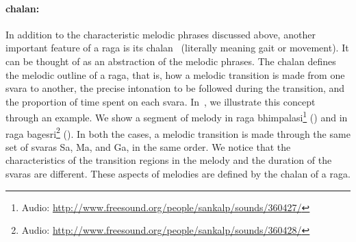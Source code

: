 \paragraph{\Gls{chalan}:} In addition to the characteristic melodic phrases discussed above, another important feature of a \gls{raga} is its \gls{chalan}~\citep{rao1999raga,Bagchee1998,Suvarnalata2014} (literally meaning gait or movement). It can be thought of as an abstraction of the melodic phrases. The \gls{chalan} defines the melodic outline of a \gls{raga}, that is, how a melodic transition is made from one \gls{svara} to another, the precise intonation to be followed during the transition, and the proportion of time spent on each \gls{svara}. In~, we illustrate this concept through an example. We show a segment of melody in \gls{raga} \gls{bhimpalasi}\footnote{Audio: \url{http://www.freesound.org/people/sankalp/sounds/360427/}} () and in \gls{raga} \gls{bagesri}\footnote{Audio: \url{http://www.freesound.org/people/sankalp/sounds/360428/}} (). In both the cases, a melodic transition is made through the same set of \glspl{svara} Sa, Ma, and Ga, in the same order. We notice that the characteristics of the transition regions in the melody and the duration of the \glspl{svara} are different. These aspects of melodies are defined by the \gls{chalan} of a \gls{raga}.

